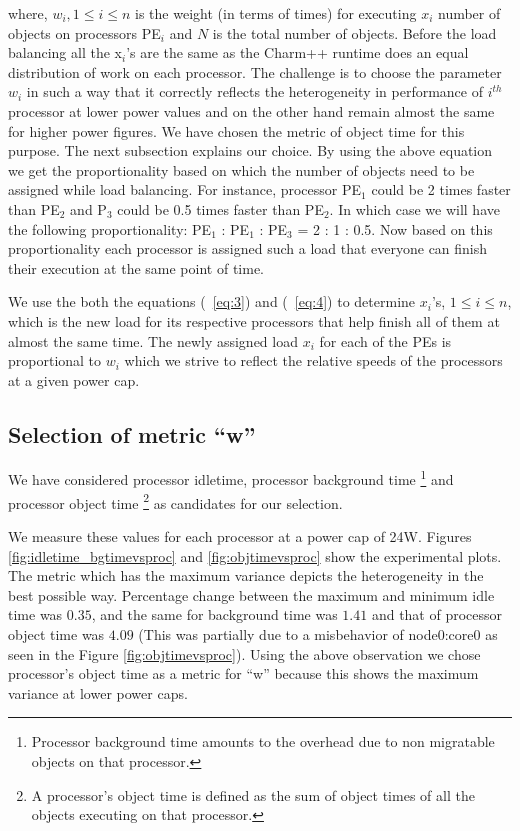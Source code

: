   where, $w_i, 1 \leq i \leq n$ is the weight (in terms of times) for executing
  $x_i$ number of objects on processors PE$_i$ and $N$ is the total number of objects. 
  Before the load balancing all the x$_i$'s are the same as the Charm++
  runtime does an equal distribution of work on each processor. 
  The challenge is to choose the parameter $w_i$ in such a way that it correctly reflects the heterogeneity
  in performance of $i^{th}$ processor at lower power values and on the other hand  
  remain almost the same for higher power figures. We have chosen the metric of object time 
  for this purpose. The next subsection explains our  choice.
  By using the above
  equation we get the proportionality based on which the number of objects need
  to be assigned while load balancing. For instance, processor PE$_1$ could
  be 2 times faster than PE$_2$ and P$_3$ could be 0.5 times faster than
  PE$_2$. In which case we will have the following proportionality: PE$_1$ :
  PE$_1$ : PE$_3$ = 2 : 1 : 0.5. Now based on this proportionality each processor is
  assigned such a load that everyone can finish their execution at the same
  point of time.  
  
  We use the both the equations (~\ref{eq:3}) and (~\ref{eq:4}) to determine
  $x_i$'s, $1 \leq i \leq n$, which is the new load for its respective
  processors that help finish all of them at almost the same time. The newly
  assigned load $x_i$ for each of the PEs is proportional to $w_i$ which we
  strive to reflect the relative speeds of the processors at a given power cap. 

\subsection{Selection of metric ``w''} 
We have considered processor idletime, processor background time
\footnote{Processor background time amounts to the overhead due to non
  migratable objects on that processor.} and processor object time \footnote{A
    processor's object time is defined as the sum of object times of all the
      objects executing on that processor.} as candidates for our selection.

      We measure these values for each processor at a power cap of 24W.
      Figures \ref{fig:idletime_bgtimevsproc} and \ref{fig:objtimevsproc} show
      the experimental plots.  The metric which has the maximum variance
      depicts the heterogeneity in the best possible way.  Percentage change
      between the maximum and minimum idle time was $0.35$, and the same for
      background time was $1.41$ and that of processor object time was $4.09$
      (This was partially due to a misbehavior of node0:core0 as seen in the
       Figure \ref{fig:objtimevsproc}).  Using the above observation we chose
      processor's object time as a metric for ``w'' because this shows the
      maximum variance at lower power caps. 
   

